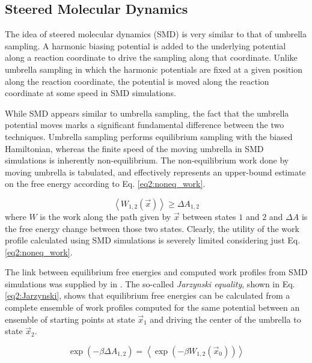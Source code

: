 \subsection{Steered Molecular Dynamics}

The idea of steered molecular dynamics (SMD) is very similar to that of umbrella
sampling. A harmonic biasing potential is added to the underlying potential
along a reaction coordinate to drive the sampling along that coordinate. Unlike
umbrella sampling in which the harmonic potentials are fixed at a given position
along the reaction coordinate, the potential is moved along the reaction
coordinate at some speed in SMD simulations.

While SMD appears similar to umbrella sampling, the fact that the umbrella
potential moves marks a significant fundamental difference between the two
techniques. Umbrella sampling performs equilibrium sampling with the biased
Hamiltonian, whereas the finite speed of the moving umbrella in SMD simulations
is inherently non-equilibrium. \cite{Tuckerman_Book_StatMech_TheoryAndSim} The
non-equilibrium work done by moving umbrella is tabulated, and effectively
represents an upper-bound estimate on the free energy according to Eq.
\ref{eq2:noneq_work}. \cite{Tuckerman_Book_StatMech_TheoryAndSim}

\begin{equation}
   \left\langle W_{1,2}(\vec{x}) \right\rangle \geq \Delta A_{1,2}
   \label{eq2:noneq_work}
\end{equation}
where $W$ is the work along the path given by $\vec{x}$ between states $1$ and
$2$ and $\Delta A$ is the free energy change between those two states. Clearly,
the utility of the work profile calculated using SMD simulations is severely
limited considering just Eq. \ref{eq2:noneq_work}.

The link between equilibrium free energies and computed work profiles from SMD
simulations was supplied by \citeauthor{Jarzynski_PhysRevLett_1997_v78_p2690} in
\citeyear{Jarzynski_PhysRevLett_1997_v78_p2690}.
\cite{Jarzynski_PhysRevLett_1997_v78_p2690} The so-called \emph{Jarzynski
equality}, shown in Eq. \ref{eq2:Jarzynski}, shows that equilibrium free
energies can be calculated from a complete ensemble of work profiles computed
for the same potential between an ensemble of starting points at state
$\vec{x}_1$ and driving the center of the umbrella to state $\vec{x}_2$.

\begin{equation}
   \exp \left(-\beta \Delta A _{1,2} \right) = 
      \left \langle \exp \left( -\beta W_{1,2}(\vec{x}_0) \right) \right \rangle
   \label{eq2:Jarzynski}
\end{equation}

